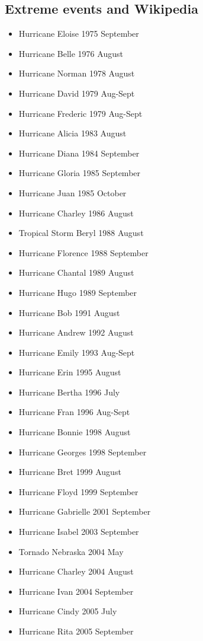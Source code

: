 \subsection{Extreme events and Wikipedia}
\begin{multicols}{2}
\begin{itemize}
\item Hurricane Eloise 1975 September
\item Hurricane Belle 1976 August
\item Hurricane Norman 1978 August
\item Hurricane David 1979 Aug-Sept
\item Hurricane Frederic 1979 Aug-Sept
\item Hurricane Alicia 1983 August
\item Hurricane Diana 1984 September
\item Hurricane Gloria 1985 September
\item Hurricane Juan	1985 October
\item Hurricane Charley 1986 August
\item Tropical Storm Beryl 1988 August
\item Hurricane Florence 1988 September	
\item Hurricane Chantal 1989 August
\item Hurricane Hugo 1989 September
\item Hurricane Bob 1991 August
\item Hurricane Andrew 1992 August
\item Hurricane Emily 1993 Aug-Sept
\item Hurricane Erin 1995 August
\item Hurricane Bertha 1996 July
\item Hurricane Fran 1996 Aug-Sept
\item Hurricane Bonnie 1998 August
\item Hurricane Georges 1998 September
\item Hurricane Bret 1999 August
\item Hurricane Floyd 1999 September
\item Hurricane Gabrielle 2001 September
\item Hurricane Isabel 2003 September
\item Tornado Nebraska 2004 May
\item Hurricane Charley 2004 August
\item Hurricane Ivan 2004 September
\item Hurricane Cindy 2005 July
\item Hurricane Rita 2005 September

\end{itemize}
\end{multicols}
